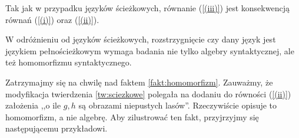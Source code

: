 \begin{fakt}
	Tak jak w przypadku języków ścieżkowych, równanie (\ref{(iii)}) jest konsekwencją równań (\ref{(i)}) oraz (\ref{(ii)}).
\end{fakt}

\begin{fakt}\label{fakt:homomorfizm}
	W odróżnieniu od języków ścieżkowych, rozstrzygnięcie czy dany język jest językiem pełnościeżkowym wymaga badania nie tylko algebry syntaktycznej, ale też homomorfizmu syntaktycznego.
\end{fakt}

Zatrzymajmy się na chwilę nad faktem \ref{fakt:homomorfizm}. Zauważmy, że modyfikacja twierdzenia \ref{tw:sciezkowe} polegała na dodaniu do równości (\ref{(ii)}) założenia ,,o ile $g,h$ są obrazami niepustych lasów''. Rzeczywiście opisuje to homomorfizm, a nie algebrę. Aby zilustrować ten fakt, przyjrzyjmy się następującemu przykładowi.

